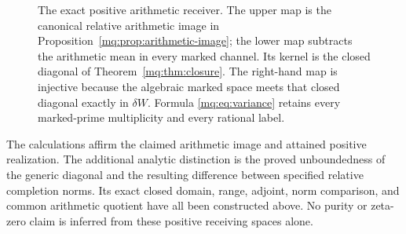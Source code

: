 \begin{figure}[ht]
\centering
{}
\caption{The exact positive arithmetic receiver. The upper map is
the canonical relative arithmetic image in
Proposition~\ref{mq:prop:arithmetic-image}; the lower map subtracts
the arithmetic mean in every marked channel. Its kernel is the
closed diagonal of Theorem~\ref{mq:thm:closure}. The right-hand map
is injective because the algebraic marked space meets that closed
diagonal exactly in $\delta W$. Formula \eqref{mq:eq:variance}
retains every marked-prime multiplicity and every rational label.}
\end{figure}

The calculations affirm the claimed arithmetic image and attained
positive realization. The additional analytic distinction is the
proved unboundedness of the generic diagonal and the resulting
difference between specified relative completion norms. Its exact
closed domain, range, adjoint, norm comparison, and common arithmetic
quotient have all been constructed above. No purity or zeta-zero
claim is inferred from these positive receiving spaces alone.

